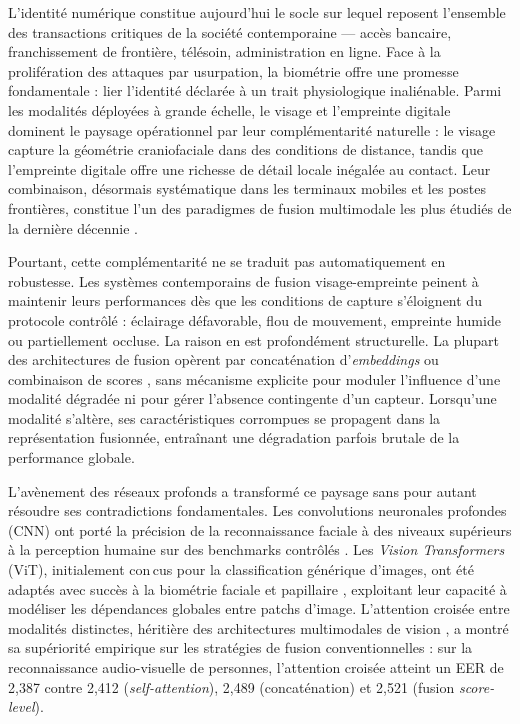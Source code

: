 \documentclass[12pt,a4paper]{report}
\begin{document}
L'identit\'{e} num\'{e}rique constitue aujourd'hui le socle sur lequel reposent l'ensemble des transactions critiques de la soci\'{e}t\'{e} contemporaine --- acc\`{e}s bancaire, franchissement de fronti\`{e}re, t\'{e}l\'{e}soin, administration en ligne. Face \`{a} la prolif\'{e}ration des attaques par usurpation, la biom\'{e}trie offre une promesse fondamentale : lier l'identit\'{e} d\'{e}clar\'{e}e \`{a} un trait physiologique inali\'{e}nable. Parmi les modalit\'{e}s d\'{e}ploy\'{e}es \`{a} grande \'{e}chelle, le visage et l'empreinte digitale dominent le paysage op\'{e}rationnel par leur compl\'{e}mentarit\'{e} naturelle : le visage capture la g\'{e}om\'{e}trie craniofaciale dans des conditions de distance, tandis que l'empreinte digitale offre une richesse de d\'{e}tail locale in\'{e}gal\'{e}e au contact. Leur combinaison, d\'{e}sormais syst\'{e}matique dans les terminaux mobiles et les postes fronti\`{e}res, constitue l'un des paradigmes de fusion multimodale les plus \'{e}tudi\'{e}s de la derni\`{e}re d\'{e}cennie \cite{jain2005score, nandakumar2008likelihood}.

Pourtant, cette compl\'{e}mentarit\'{e} ne se traduit pas automatiquement en robustesse. Les syst\`{e}mes contemporains de fusion visage-empreinte peinent \`{a} maintenir leurs performances d\`{e}s que les conditions de capture s'\'{e}loignent du protocole contr\^{o}l\'{e} : \'{e}clairage d\'{e}favorable, flou de mouvement, empreinte humide ou partiellement occluse. La raison en est profond\'{e}ment structurelle. La plupart des architectures de fusion op\`{e}rent par concat\'{e}nation d'\emph{embeddings} ou combinaison de scores \cite{soleymani2018generalized, soleymani2019multi}, sans m\'{e}canisme explicite pour moduler l'influence d'une modalit\'{e} d\'{e}grad\'{e}e ni pour g\'{e}rer l'absence contingente d'un capteur. Lorsqu'une modalit\'{e} s'alt\`{e}re, ses caract\'{e}ristiques corrompues se propagent dans la repr\'{e}sentation fusionn\'{e}e, entra\^{i}nant une d\'{e}gradation parfois brutale de la performance globale.

L'av\`{e}nement des r\'{e}seaux profonds a transform\'{e} ce paysage sans pour autant r\'{e}soudre ses contradictions fondamentales. Les convolutions neuronales profondes (CNN) ont port\'{e} la pr\'{e}cision de la reconnaissance faciale \`{a} des niveaux sup\'{e}rieurs \`{a} la perception humaine sur des benchmarks contr\^{o}l\'{e}s \cite{deng2019arcface}. Les \emph{Vision Transformers} (ViT), initialement con\,{c}us pour la classification g\'{e}n\'{e}rique d'images, ont \'{e}t\'{e} adapt\'{e}s avec succ\`{e}s \`{a} la biom\'{e}trie faciale \cite{dan2023transface, you2025lvface} et papillaire \cite{grosz2024afrnet, pandey2025ridgeformer}, exploitant leur capacit\'{e} \`{a} mod\'{e}liser les d\'{e}pendances globales entre patchs d'image. L'attention crois\'{e}e entre modalit\'{e}s distinctes, h\'{e}riti\`{e}re des architectures multimodales de vision \cite{nagrani2021attention}, a montr\'{e} sa sup\'{e}riorit\'{e} empirique sur les strat\'{e}gies de fusion conventionnelles \cite{gnanapraveen2024cross} : sur la reconnaissance audio-visuelle de personnes, l'attention crois\'{e}e atteint un EER de 2,387 contre 2,412 (\emph{self-attention}), 2,489 (concat\'{e}nation) et 2,521 (fusion \emph{score-level}).
\end{document}

